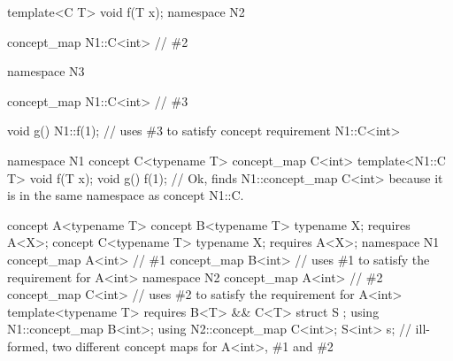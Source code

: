 \documentclass[american]{book}
\begin{document}
\begin{paras}
\begin{codeblock}
{  template<C T> void f(T x);
}
namespace N2 {
  concept_map N1::C<int> { } // \#2

  namespace N3 {
    concept_map N1::C<int> { } // \#3

    void g() { 
      N1::f(1); // uses \#3 to satisfy concept requirement N1::C<int>
    }
  }
}
\end{codeblock}
\addedConcepts{\mbox{\exitexample} \mbox{\exitnote}}

\pnum 
{}
\addedConcepts{\mbox{\enterexample}}
\begin{codeblock}
namespace N1 {
  concept C<typename T> { }
  concept_map C<int> { }
}
template<N1::C T> void f(T x);
void g() { 
  f(1); // Ok, finds N1::concept_map C<int> because it is in the same namespace as concept N1::C.
} 
\end{codeblock}
\addedConcepts{\mbox{\exitexample}}\addedConcepts{\mbox{\exitnote}}

\pnum
{}
\addedConcepts{\mbox{\enterexample}}
\color{addclr}
\begin{codeblock}
concept A<typename T> { }
concept B<typename T> {
  typename X;
  requires A<X>;
}
concept C<typename T> {
  typename X;
  requires A<X>;
}
namespace N1 {
  concept_map A<int> { }  // \#1
  concept_map B<int> { }  // uses \#1 to satisfy the requirement for A<int>
}
namespace N2 {
  concept_map A<int> { }  // \#2
  concept_map C<int> { }  // uses \#2 to satisfy the requirement for A<int>
}
template<typename T> requires B<T> && C<T>
struct S { };
using N1::concept_map B<int>;
using N2::concept_map C<int>;
S<int> s; // ill-formed, two different concept maps for A<int>, \#1 and \#2
\end{codeblock}
\color{black}
\addedConcepts{\mbox{\exitexample}}


\end{paras}
\end{document}
